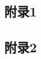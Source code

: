 \cleardoublepage

{

    \appendixsubsecmajornumbering

    \subsection{附录1}

    \subsection{附录2}
}